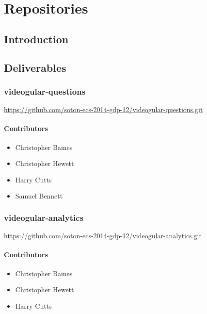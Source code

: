 \chapter{Repositories} \label{Chapter:Repositories}

\begin{preamble}
\end{preamble}

\section{Introduction}

\section{Deliverables}

\subsection{videogular-questions}
\label{Section:Repo_videogular_questions}

\url{https://github.com/soton-ecs-2014-gdp-12/videogular-questions.git}

\subsubsection{Contributors}
\begin{itemize}
  \item Christopher Baines
  \item Christopher Hewett
  \item Harry Cutts
  \item Samuel Bennett
\end{itemize}

\subsection{videogular-analytics}
\label{Section:Repo_videogular_analytics}

\url{https://github.com/soton-ecs-2014-gdp-12/videogular-analytics.git}

\subsubsection{Contributors}
\begin{itemize}
  \item Christopher Baines
  \item Christopher Hewett
  \item Harry Cutts
\end{itemize}

